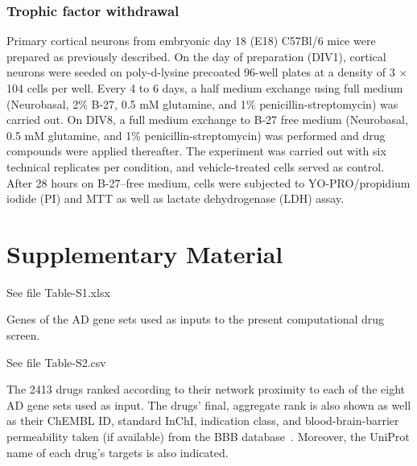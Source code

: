 \documentclass[letterpaper]{article}
\begin{document}
\subsubsection{Trophic factor withdrawal}

Primary cortical neurons from embryonic day 18 (E18) C57Bl/6 mice were
prepared as previously described. On the day of preparation (DIV1), cortical
neurons were seeded on poly-d-lysine precoated 96-well plates at a density of
3 $\times$ 104 cells per well. Every 4 to 6 days, a half medium exchange using full
medium (Neurobasal, 2\% B-27, 0.5 mM glutamine, and 1\% penicillin-streptomycin)
was carried out. On DIV8, a full medium exchange to B-27 free medium
(Neurobasal, 0.5 mM glutamine, and 1\% penicillin-streptomycin) was performed
and drug compounds were applied thereafter. The experiment was carried out
with six technical replicates per condition, and vehicle-treated cells
served as control. After 28 hours on B-27–free medium, cells were subjected to
YO-PRO/propidium iodide (PI) and MTT as well as lactate dehydrogenase (LDH)
assay.




\newpage

\section*{Supplementary Material}

\setcounter{table}{0}
\makeatletter 
\renewcommand{\tablename}{Table S} %
\makeatother

\setcounter{figure}{0}
\makeatletter 
\renewcommand{\figurename}{Figure S} %
\makeatother

\begin{table}[p]
  See file Table-S1.xlsx
\caption{
  Genes of the AD gene sets used as inputs to the present computational drug screen.
}
\label{tab:genes-in-genesets}
\end{table}

\begin{table}[p]
  See file Table-S2.csv
\caption{
  The 2413 drugs ranked according to their network proximity to each of the eight
  AD gene sets used as input.  The drugs' final, aggregate rank is also shown
  as well as their ChEMBL ID, standard InChI, indication class, and
  blood-brain-barrier permeability taken (if available) from the BBB
  database~\citep{Meng2021}.  Moreover, the UniProt name of each drug's
  targets is also indicated.
}
\label{tab:ranked-drugs}
\end{table}
\end{document}
